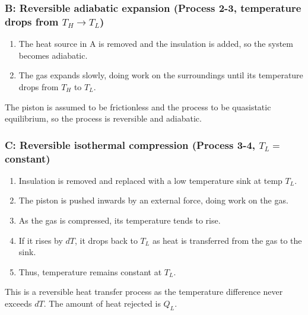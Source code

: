 \documentclass[class=report, crop=false, 12pt,a4paper]{standalone}
\begin{document}
\subsubsection{B: Reversible adiabatic expansion (Process 2-3, temperature drops from $T_H \rightarrow T_L$)}
\begin{enumerate}[noitemsep]
  \item The heat source in A is removed and the insulation is added, so the system becomes adiabatic. 
  \item The gas expands slowly, doing work on the surroundings until its temperature drops from $T_H$ to $T_L$.
\end{enumerate}
The piston is assumed to be frictionless and the process to be quasistatic equilibrium, so the process is reversible and adiabatic. 
\subsubsection{C: Reversible isothermal compression (Process 3-4, $T_L =$ constant)}
\begin{enumerate}[noitemsep]
  \item Insulation is removed and replaced with a low temperature sink at temp $T_L$.
  \item The piston is pushed inwards by an external force, doing work on the gas.
  \item As the gas is compressed, its temperature tends to rise. 
  \item If it rises by $dT$, it drops back to $T_L$ as heat is transferred from the gas to the sink.
  \item Thus, temperature remains constant at $T_L$.
\end{enumerate}
This is a reversible heat transfer process as the temperature difference never exceeds $dT$. The amount of heat rejected is $Q_L$.
\end{document}
